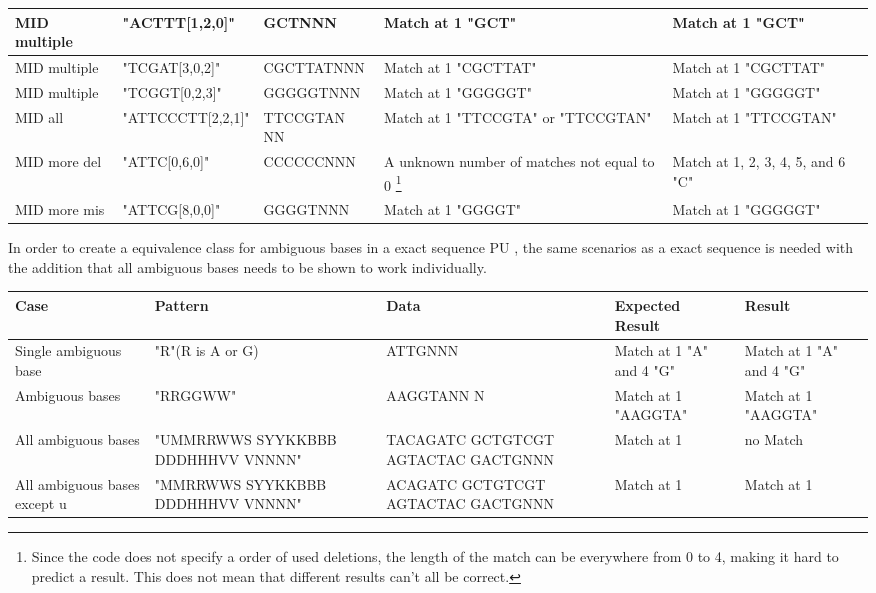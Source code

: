\documentclass[12pt]{article}
\newcommand{\pu}{PU }
\begin{document}
\begin{table}[H]
\begin{tabular}{p{4cm}|p{3.6cm}|p{2.5cm}|p{2.2cm}|p{2.2cm}}
\rowcolor{lightgreen}
MID multiple		& "ACTTT[1,2,0]" & GCTNNN & Match at 1 "GCT" & Match at 1 "GCT"\\ \hline
\rowcolor{lightgreen}
MID multiple		& "TCGAT[3,0,2]" & CGCTTATNNN & Match at 1 "CGCTTAT" & Match at 1 "CGCTTAT" \\ \hline
\rowcolor{lightgreen}
MID multiple		& "TCGGT[0,2,3]" & GGGGGTNNN & Match at 1 "GGGGGT" & Match at 1 "GGGGGT" \\ \hline
\rowcolor{lightgreen}
MID all			& "ATTCCCTT[2,2,1]" & TTCCGTAN NN & Match at 1 "TTCCGTA" or "TTCCGTAN" & Match at 1 "TTCCGTAN"\\ \hline
\rowcolor{lightgreen}
MID more del		& "ATTC[0,6,0]" & CCCCCCNNN & A unknown number of matches not equal to 0
\footnote{Since the code does not specify a order of used deletions, the 
length of the match can be everywhere from 0 to 4, making it hard to predict a result. 
This does not mean that different results can't all be correct. } & Match at 1, 2, 3, 4, 5, and 6 "C" \\ \hline
\rowcolor{lightgreen}
MID more mis		& "ATTCG[8,0,0]" & GGGGTNNN & Match at 1 "GGGGT" & Match at 1 "GGGGGT" \\ \hline
\end{tabular}
\end{table}



In order to create a equivalence class for ambiguous bases in a exact sequence \pu, the same
scenarios as a exact sequence is needed with the addition that all ambiguous bases needs to be
shown to work individually. 
\begin{table}[H]
\begin{tabular}{p{4cm}|p{3.6cm}|p{2.5cm}|p{2.2cm}|p{2.2cm}}
Case 			& Pattern & Data & Expected Result & Result \\ \hline
\rowcolor{lightgreen}
Single ambiguous base & "R"(R is A or G) & ATTGNNN & Match at 1 "A" and 4 "G" & Match at 1 "A" and 4 "G" \\ \hline
\rowcolor{lightgreen}
Ambiguous bases	& "RRGGWW" & AAGGTANN N & Match at 1 "AAGGTA" & Match at 1 "AAGGTA" \\ \hline
\rowcolor{lightred}
All ambiguous bases & "UMMRRWWS SYYKKBBB DDDHHHVV VNNNN" & TACAGATC GCTGTCGT AGTACTAC GACTGNNN & Match at 1 & no Match \\ \hline
\rowcolor{lightgreen}
All ambiguous bases except u & "MMRRWWS SYYKKBBB DDDHHHVV VNNNN" & ACAGATC GCTGTCGT AGTACTAC GACTGNNN & Match at 1 & Match at 1 \\ 
\end{tabular}
\end{table}
\end{document}
